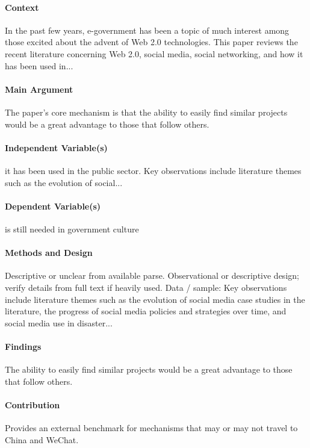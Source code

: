 \documentclass[12pt]{article}
\begin{document}
\paragraph{Context} In the past few years, e-government has been a topic of much interest among those excited about the advent of Web 2.0 technologies. This paper reviews the recent literature concerning Web 2.0, social media, social networking, and how it has been used in...

\paragraph{Main Argument} The paper's core mechanism is that the ability to easily find similar projects would be a great advantage to those that follow others.

\paragraph{Independent Variable(s)} it has been used in the public sector. Key observations include literature themes such as the evolution of social...

\paragraph{Dependent Variable(s)} is still needed in government culture

\paragraph{Methods and Design} Descriptive or unclear from available parse. Observational or descriptive design; verify details from full text if heavily used. Data / sample: Key observations include literature themes such as the evolution of social media case studies in the literature, the progress of social media policies and strategies over time, and social media use in disaster...

\paragraph{Findings} The ability to easily find similar projects would be a great advantage to those that follow others.

\paragraph{Contribution} Provides an external benchmark for mechanisms that may or may not travel to China and WeChat.
\end{document}

